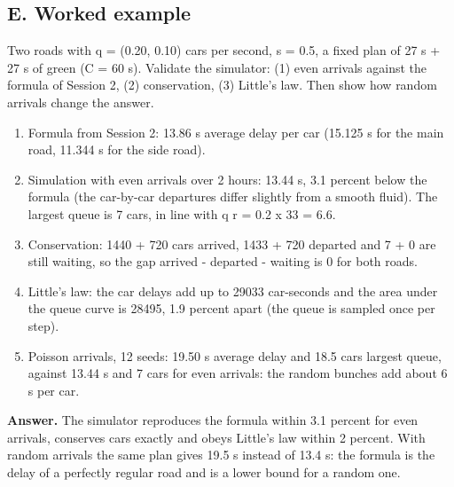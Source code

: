 \documentclass[11pt,a4paper]{article}
\begin{document}
\subsection*{E. Worked example}
Two roads with q = (0.20, 0.10) cars per second, s = 0.5, a fixed plan of 27 s + 27 s of green (C = 60 s). Validate the simulator: (1) even arrivals against the formula of Session 2, (2) conservation, (3) Little's law. Then show how random arrivals change the answer.
\begin{enumerate}[nosep]
\item Formula from Session 2: 13.86 s average delay per car (15.125 s for the main road, 11.344 s for the side road).
\item Simulation with even arrivals over 2 hours: 13.44 s, 3.1 percent below the formula (the car-by-car departures differ slightly from a smooth fluid). The largest queue is 7 cars, in line with q r = 0.2 x 33 = 6.6.
\item Conservation: 1440 + 720 cars arrived, 1433 + 720 departed and 7 + 0 are still waiting, so the gap arrived - departed - waiting is 0 for both roads.
\item Little's law: the car delays add up to 29033 car-seconds and the area under the queue curve is 28495, 1.9 percent apart (the queue is sampled once per step).
\item Poisson arrivals, 12 seeds: 19.50 s average delay and 18.5 cars largest queue, against 13.44 s and 7 cars for even arrivals: the random bunches add about 6 s per car.
\end{enumerate}
\textbf{Answer.} The simulator reproduces the formula within 3.1 percent for even arrivals, conserves cars exactly and obeys Little's law within 2 percent. With random arrivals the same plan gives 19.5 s instead of 13.4 s: the formula is the delay of a perfectly regular road and is a lower bound for a random one.
\end{document}
